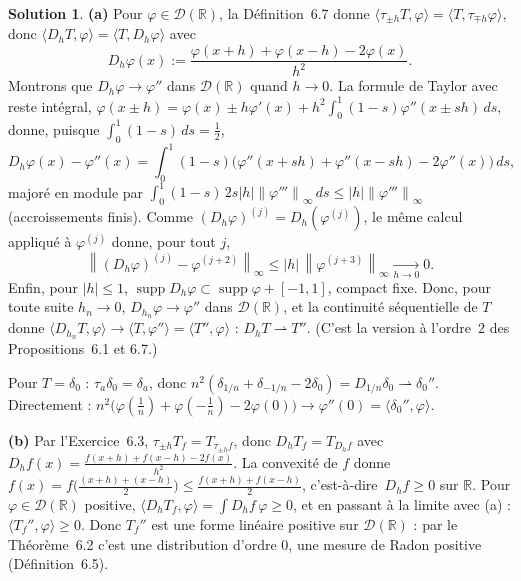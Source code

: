\documentclass[11pt,a4paper]{article}
\newcommand{\R}{\mathbb{R}}
\newcommand{\norm}[1]{\left\|#1\right\|}
\newcommand{\ie}{c'est-à-dire}
\newcommand{\wk}{\rightharpoonup}
\DeclareMathOperator{\supp}{supp}
\newcommand{\D}{\mathcal{D}}
\theoremstyle{definition}
\newtheorem*{solution}{Solution}
\begin{document}
\begin{solution}
\noindent\textbf{(a)} Pour $\varphi\in\D(\R)$, la Définition~6.7 donne $\langle\tau_{\pm h}T,\varphi\rangle=\langle T,\tau_{\mp h}\varphi\rangle$, donc $\langle D_hT,\varphi\rangle=\langle T,D_h\varphi\rangle$ avec
\[
D_h\varphi(x):=\frac{\varphi(x+h)+\varphi(x-h)-2\varphi(x)}{h^2}.
\]
Montrons que $D_h\varphi\to\varphi''$ dans $\D(\R)$ quand $h\to0$. La formule de Taylor avec reste intégral, $\varphi(x\pm h)=\varphi(x)\pm h\varphi'(x)+h^2\int_0^1(1-s)\varphi''(x\pm sh)\,ds$, donne, puisque $\int_0^1(1-s)\,ds=\frac12$,
\[
D_h\varphi(x)-\varphi''(x)=\int_0^1(1-s)\big(\varphi''(x+sh)+\varphi''(x-sh)-2\varphi''(x)\big)\,ds ,
\]
majoré en module par $\int_0^1(1-s)\,2s|h|\norm{\varphi'''}_\infty\,ds\le|h|\norm{\varphi'''}_\infty$ (accroissements finis). Comme $(D_h\varphi)^{(j)}=D_h(\varphi^{(j)})$, le même calcul appliqué à $\varphi^{(j)}$ donne, pour tout $j$,
\[
\norm{(D_h\varphi)^{(j)}-\varphi^{(j+2)}}_\infty\le|h|\,\norm{\varphi^{(j+3)}}_\infty\xrightarrow[h\to0]{}0 .
\]
Enfin, pour $|h|\le1$, $\supp D_h\varphi\subset\supp\varphi+[-1,1]$, compact fixe. Donc, pour toute suite $h_n\to0$, $D_{h_n}\varphi\to\varphi''$ dans $\D(\R)$, et la continuité séquentielle de $T$ donne $\langle D_{h_n}T,\varphi\rangle\to\langle T,\varphi''\rangle=\langle T'',\varphi\rangle$ : $D_hT\wk T''$. (C'est la version à l'ordre~$2$ des Propositions~6.1 et 6.7.)

Pour $T=\delta_0$ : $\tau_a\delta_0=\delta_a$, donc $n^2(\delta_{1/n}+\delta_{-1/n}-2\delta_0)=D_{1/n}\delta_0\wk\delta_0''$. Directement : $n^2\big(\varphi(\tfrac1n)+\varphi(-\tfrac1n)-2\varphi(0)\big)\to\varphi''(0)=\langle\delta_0'',\varphi\rangle$.

\medskip
\noindent\textbf{(b)} Par l'Exercice~6.3, $\tau_{\pm h}T_f=T_{\tau_{\pm h}f}$, donc $D_hT_f=T_{D_hf}$ avec $D_hf(x)=\frac{f(x+h)+f(x-h)-2f(x)}{h^2}$. La convexité de $f$ donne $f(x)=f\big(\frac{(x+h)+(x-h)}2\big)\le\frac{f(x+h)+f(x-h)}2$, \ie\ $D_hf\ge0$ sur $\R$. Pour $\varphi\in\D(\R)$ positive, $\langle D_hT_f,\varphi\rangle=\int D_hf\,\varphi\ge0$, et en passant à la limite avec (a) : $\langle T_f'',\varphi\rangle\ge0$. Donc $T_f''$ est une forme linéaire positive sur $\D(\R)$ : par le Théorème~6.2 c'est une distribution d'ordre $0$, une mesure de Radon positive (Définition~6.5).


\end{solution}
\end{document}
